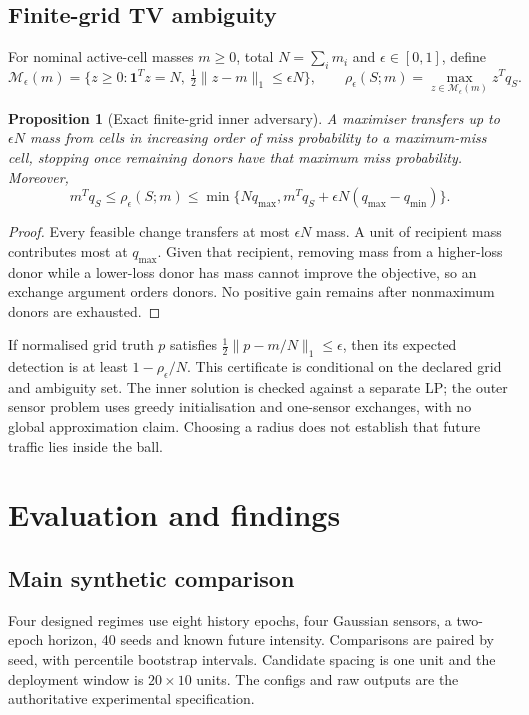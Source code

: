 \documentclass[11pt]{article}
\newtheorem{proposition}{Proposition}
\begin{document}
\subsection{Finite-grid TV ambiguity}
For nominal active-cell masses $m\ge0$, total $N=\sum_i m_i$ and
$\epsilon\in[0,1]$, define
\[
\mathcal M_\epsilon(m)=\{z\ge0:\mathbf1^Tz=N,\ \tfrac12\|z-m\|_1\le\epsilon N\},
\qquad \rho_\epsilon(S;m)=\max_{z\in\mathcal M_\epsilon(m)}z^Tq_S.
\]
\begin{proposition}[Exact finite-grid inner adversary]
A maximiser transfers up to $\epsilon N$ mass from cells in increasing
order of miss probability to a maximum-miss cell, stopping once remaining
donors have that maximum miss probability. Moreover,
\[
m^Tq_S\le\rho_\epsilon(S;m)\le
\min\{Nq_{\max},m^Tq_S+\epsilon N(q_{\max}-q_{\min})\}.
\]
\end{proposition}
\begin{proof}
Every feasible change transfers at most $\epsilon N$ mass. A unit of
recipient mass contributes most at $q_{\max}$. Given that recipient,
removing mass from a higher-loss donor while a lower-loss donor has mass
cannot improve the objective, so an exchange argument orders donors.
No positive gain remains after nonmaximum donors are exhausted.
\end{proof}
If normalised grid truth $p$ satisfies
$\tfrac12\|p-m/N\|_1\le\epsilon$, then its expected detection is at least
$1-\rho_\epsilon/N$. This certificate is conditional on the declared grid
and ambiguity set. The inner solution is checked against a separate LP;
the outer sensor problem uses greedy initialisation and one-sensor
exchanges, with no global approximation claim. Choosing a radius does not
establish that future traffic lies inside the ball.

\section{Evaluation and findings}
\subsection{Main synthetic comparison}
Four designed regimes use eight history epochs, four Gaussian sensors,
a two-epoch horizon, 40 seeds and known future intensity. Comparisons are
paired by seed, with percentile bootstrap intervals. Candidate spacing is
one unit and the deployment window is $20\times10$ units. The configs and
raw outputs are the authoritative experimental specification.
\end{document}
